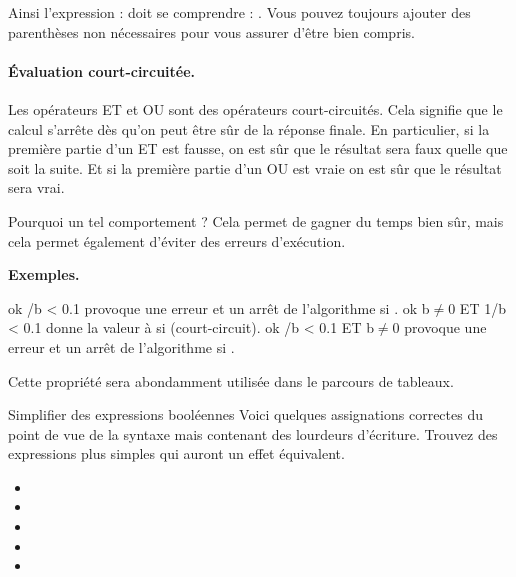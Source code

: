 				Ainsi l'expression : 
				doit se comprendre : .
				Vous pouvez toujours ajouter des parenthèses non nécessaires
				pour vous assurer d'être bien compris.

			\paragraph{Évaluation court-circuitée.}\label{court-circuit}
			
				Les opérateurs ET et OU sont des opérateurs court-circuités.
				Cela signifie que le calcul s'arrête dès qu'on peut être sûr
				de la réponse finale.
				En particulier, si la première partie d'un ET est fausse,
				on est sûr que le résultat sera faux quelle que soit la suite.
				Et si la première partie d'un OU est vraie 
				on est sûr que le résultat sera vrai.
				
				Pourquoi un tel comportement ?
				Cela permet de gagner du temps bien sûr,
				mais cela permet également d'éviter des erreurs d'exécution.
				 
				\textbf{Exemples.}
				\begin{LDA}
					\Let ok /b < 0.1
						\RComment provoque une erreur et un arrêt
						de l'algorithme si . 
					\Let ok \Gets b$\neq$0 ET 1/b < 0.1
						\RComment donne la valeur  à  
						si  (court-circuit). 
					\Let ok /b < 0.1 ET b$\neq$0
						\RComment provoque une erreur et un arrêt
						de l'algorithme si . 
				\end{LDA}
				
				Cette propriété sera abondamment utilisée dans le parcours
				de tableaux.
				
			\begin{Exercice}{Simplifier des expressions booléennes}
				Voici quelques assignations correctes du point de vue de la
				syntaxe mais contenant des lourdeurs d’écriture.
				Trouvez des expressions plus simples
				qui auront un effet équivalent.
				\begin{itemize}
					\item {}
					\item {}
					\item {}
					\item {}
					\item {}
				\end{itemize}		
			\end{Exercice}
		
